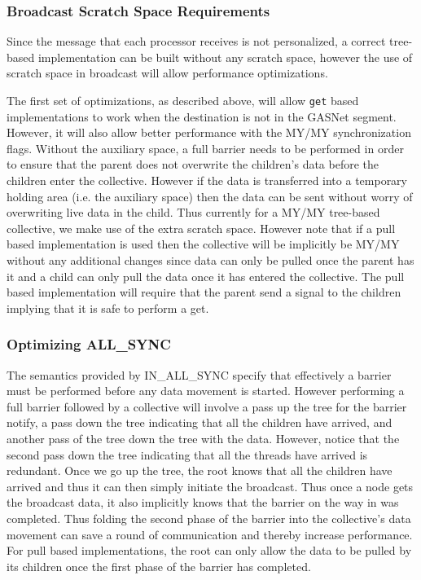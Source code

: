 \documentclass[times,10pt]{article}
\begin{document}
\subsubsection{Broadcast Scratch Space Requirements}
Since the message that each processor receives is not personalized, a correct tree-based implementation can be built without any scratch space, however the use of scratch space in broadcast will allow performance optimizations.

The first set of optimizations, as described above, will allow \texttt{get} based implementations to work when the destination is not in the GASNet segment. However, it will also allow better performance with the MY/MY synchronization flags. Without the auxiliary space, a full barrier needs to be performed in order to ensure that the parent does not overwrite the children's data before the children enter the collective. However if the data is transferred into a temporary holding area (i.e. the auxiliary space) then the data can be sent without worry of overwriting live data in the child. Thus currently for a MY/MY tree-based collective, we make use of the extra scratch space. However note that if a pull based implementation is used then the collective will be implicitly be MY/MY without any additional changes since data can only be pulled once the parent has it and a child can only pull the data once it has entered the collective. The pull based implementation will require that the parent send a signal to the children implying that it is safe to perform a get. 

\subsubsection{Optimizing ALL\_SYNC}
 The semantics provided by IN\_ALL\_SYNC specify that effectively a barrier must be performed before any data movement is started. However performing a full barrier followed by a collective will involve a pass up the tree for the barrier notify, a pass down the tree indicating that all the children have arrived, and another pass of the tree down the tree with the data. However, notice that the second pass down the tree indicating that all the threads have arrived is redundant. Once we go up the tree, the root knows that all the children have arrived and thus it can then simply initiate the broadcast. Thus once a node gets the broadcast data, it also implicitly knows that the barrier on the way in was completed. Thus folding the second phase of the barrier into the collective's data movement can save a round of communication and thereby increase performance. For pull based implementations, the root can only allow the data to be pulled by its children once the first phase of the barrier has completed. 
 
\end{document}
